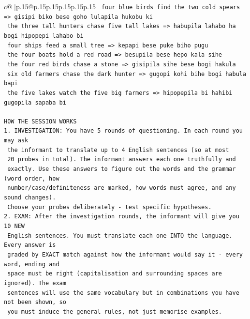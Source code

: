 \documentclass{article}
\begin{document}
{\begin{supertabular}{c@{$\;$}|p{.15\linewidth}@{}p{.15\linewidth}p{.15\linewidth}p{.15\linewidth}p{.15\linewidth}p{.15\linewidth}}
{{{\texttt{    four blue birds find the two cold spears  =>  gisipi biko bese goho lulapila hukobu ki} \\
\texttt{    the three tall hunters chase five tall lakes  =>  habupila lahabo ha bogi hipopepi lahabo bi} \\
\texttt{    four ships feed a small tree  =>  kepapi bese puke biho pugu} \\
\texttt{    the four boats hold a red road  =>  besupila bese hepo kala sihe} \\
\texttt{    the four red birds chase a stone  =>  gisipila sihe bese bogi hakula} \\
\texttt{    six old farmers chase the dark hunter  =>  gugopi kohi bihe bogi habula bapi} \\
\texttt{    the five lakes watch the five big farmers  =>  hipopepila bi hahibi gugopila sapaba bi} \\
\\ 
\texttt{HOW THE SESSION WORKS} \\
\texttt{1. INVESTIGATION: You have 5 rounds of questioning. In each round you may ask} \\
\texttt{   the informant to translate up to 4 English sentences (so at most} \\
\texttt{   20 probes in total). The informant answers each one truthfully and} \\
\texttt{   exactly. Use these answers to figure out the words and the grammar (word order, how} \\
\texttt{   number/case/definiteness are marked, how words must agree, and any sound changes).} \\
\texttt{   Choose your probes deliberately {-} test specific hypotheses.} \\
\texttt{2. EXAM: After the investigation rounds, the informant will give you 10 NEW} \\
\texttt{   English sentences. You must translate each one INTO the language. Every answer is} \\
\texttt{   graded by EXACT match against how the informant would say it {-} every word, ending and} \\
\texttt{   space must be right (capitalisation and surrounding spaces are ignored). The exam} \\
\texttt{   sentences will use the same vocabulary but in combinations you have not been shown, so} \\
\texttt{   you must induce the general rules, not just memorise examples.} \\
}}}
\end{supertabular}}
\end{document}
